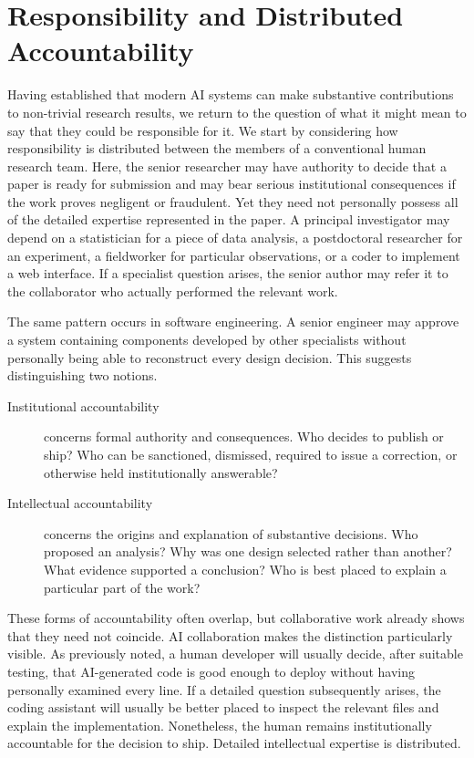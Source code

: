 \documentclass[12pt]{article}
\begin{document}
\section{Responsibility and Distributed Accountability}

Having established that modern AI systems can make substantive contributions to non-trivial research results, we return to the question of what it might mean to say that they could be responsible for it. We start by considering how responsibility is distributed between the members of a conventional human research team.
Here, the senior researcher may have authority to decide that a paper is ready for submission and may bear serious institutional consequences if the work proves negligent or fraudulent. Yet they need not personally possess all of the detailed expertise represented in the paper.
A principal investigator may depend on a statistician for a piece of data analysis, a postdoctoral researcher for an experiment, a fieldworker for particular observations, or a coder to implement a web interface. If a specialist question arises, the senior author may refer it to the collaborator who actually performed the relevant work.

The same pattern occurs in software engineering. A senior engineer may approve a system containing components developed by other specialists without personally being able to reconstruct every design decision.
This suggests distinguishing two notions.
\begin{description}
    \item[Institutional accountability] concerns formal authority and consequences. Who decides to publish or ship? Who can be sanctioned, dismissed, required to issue a correction, or otherwise held institutionally answerable?
    \item[Intellectual accountability] concerns the origins and explanation of substantive decisions. Who proposed an analysis? Why was one design selected rather than another? What evidence supported a conclusion? Who is best placed to explain a particular part of the work?
\end{description}
These forms of accountability often overlap, but collaborative work already shows that they need not coincide.
AI collaboration makes the distinction particularly visible. As previously noted, a human developer will usually decide, after suitable testing, that AI-generated code is good enough to deploy without having personally examined every line. 
If a detailed question subsequently arises, the coding assistant will usually be better placed to inspect the relevant files and explain the implementation.
Nonetheless, the human remains institutionally accountable for the decision to ship. Detailed intellectual expertise is distributed.
\end{document}
